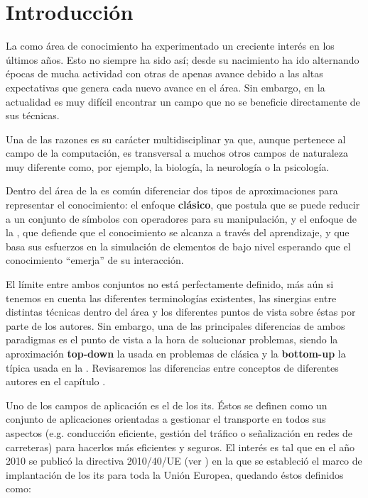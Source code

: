 \chapter{Introducción}
\label{ch:intro}

La  como área de conocimiento ha experimentado un creciente interés en los últimos años. Esto no siempre ha sido así; desde su nacimiento ha ido alternando épocas de mucha actividad con otras de apenas avance debido a las altas expectativas que genera cada nuevo avance en el área. Sin embargo, en la actualidad es muy difícil encontrar un campo que no se beneficie directamente de sus técnicas.

Una de las razones es su carácter multidisciplinar ya que, aunque pertenece al campo de la computación, es transversal a muchos otros campos de naturaleza muy diferente como, por ejemplo, la biología, la neurología o la psicología.

Dentro del área de la  es común diferenciar dos tipos de aproximaciones para representar el conocimiento: el enfoque \textbf{clásico}, que postula que se puede reducir a un conjunto de símbolos con operadores para su manipulación, y el enfoque de la , que defiende que el conocimiento se alcanza a través del aprendizaje, y que basa sus esfuerzos en la simulación de elementos de bajo nivel esperando que el conocimiento \enquote{emerja} de su interacción.

El límite entre ambos conjuntos no está perfectamente definido, más aún si tenemos en cuenta las diferentes terminologías existentes, las sinergias entre distintas técnicas dentro del área y los diferentes puntos de vista sobre éstas por parte de los autores. Sin embargo, una de las principales diferencias de ambos paradigmas es el punto de vista a la hora de solucionar problemas, siendo la aproximación \textbf{top-down} la usada en problemas de  clásica y la \textbf{bottom-up} la típica usada en la . Revisaremos las diferencias entre conceptos de diferentes autores en el capítulo .

Uno de los campos de aplicación es el de los \acrfull{its}. Éstos se definen como un conjunto de aplicaciones orientadas a gestionar el transporte en todos sus aspectos (e.g. conducción eficiente, gestión del tráfico o señalización en redes de carreteras) para hacerlos más eficientes y seguros. El interés es tal que en el año 2010 se publicó la directiva 2010/40/UE (ver \cite{parliament2010directive}) en la que se estableció el marco de implantación de los \acrshort{its} para toda la Unión Europea, quedando éstos definidos como:

